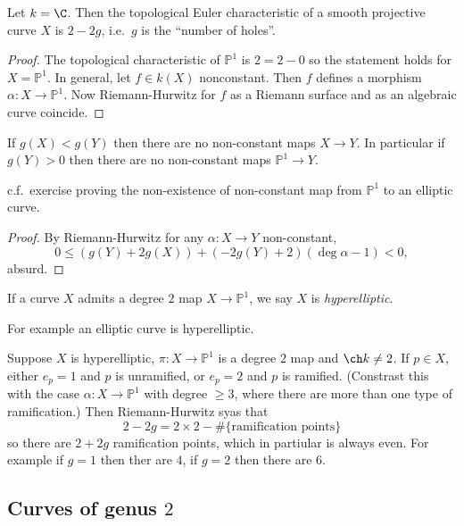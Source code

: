\documentclass[a4paper]{article}
\renewcommand*{\P}{\mathbb{P}}
\begin{document}
\begin{corollary}
  Let \(k = \C\). Then the topological Euler characteristic of a smooth projective curve \(X\) is \(2 - 2g\), i.e.\ \(g\) is the ``number of holes''.
\end{corollary}

\begin{proof}
  The topological characteristic of \(\P^1\) is \(2 = 2 - 0\) so the statement holds for \(X = \P^1\). In general, let \(f \in k(X)\) nonconstant. Then \(f\) defines a morphism \(\alpha: X \to \P^1\). Now Riemann-Hurwitz for \(f\) as a Riemann surface and as an algebraic curve coincide.
\end{proof}

\begin{corollary}
  If \(g(X) < g(Y)\) then there are no non-constant maps \(X \to Y\). In particular if \(g(Y) > 0\) then there are no non-constant maps \(\P^1 \to Y\).
\end{corollary}
c.f.\ exercise proving the non-existence of non-constant map from \(\P^1\) to an elliptic curve.

\begin{proof}
  By Riemann-Hurwitz for any \(\alpha: X \to Y\) non-constant,
  \[
    0 \leq (g(Y) + 2g(X)) + (-2g(Y) + 2)(\deg \alpha - 1) < 0,
  \]
  absurd.
\end{proof}

\begin{definition}[hyperelliptic]
  If a curve \(X\) admits a degree \(2\) map \(X \to \P^1\), we say \(X\) is \emph{hyperelliptic}.
\end{definition}
For example an elliptic curve is hyperelliptic.

Suppose \(X\) is hyperelliptic, \(\pi: X \to \P^1\) is a degree \(2\) map and \(\ch k \neq 2\). If \(p \in X\), either \(e_p = 1\) and \(p\) is unramified, or \(e_p = 2\) and \(p\) is ramified. (Constrast this with the case \(\alpha: X \to \P^1\) with degree \(\geq 3\), where there are more than one type of ramification.) Then Riemann-Hurwitz syas that
\[
  2 - 2g = 2 \times 2 - \#\{\text{ramification points}\}
\]
so there are \(2 + 2g\) ramification points, which in partiular is always even. For example if \(g = 1\) then ther are \(4\), if \(g = 2\) then there are \(6\).

\subsection{Curves of genus \(2\)}
\end{document}
